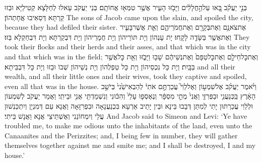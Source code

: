 {בְּנֵ֣י יַעֲקֹ֗ב בָּ֚אוּ עַל\maqqaf הַ֣חֲלָלִ֔ים וַיָּבֹ֖זּוּ הָעִ֑יר אֲשֶׁ֥ר טִמְּא֖וּ אֲחוֹתָֽם׃}
{בְּנֵי יַעֲקֹב עָאלוּ לְחַלָּצָא קְטִילַיָּא וּבַזוּ קַרְתָּא דְּסַאִיבוּ אֲחָתְהוֹן׃}
{The sons of Jacob came upon the slain, and spoiled the city, because they had defiled their sister.}{}
{אֶת\maqqaf צֹאנָ֥ם וְאֶת\maqqaf בְּקָרָ֖ם וְאֶת\maqqaf חֲמֹרֵיהֶ֑ם וְאֵ֧ת אֲשֶׁר\maqqaf בָּעִ֛יר וְאֶת\maqqaf אֲשֶׁ֥ר בַּשָּׂדֶ֖ה לָקָֽחוּ׃}
{יָת עָנְהוֹן וְיָת תּוֹרֵיהוֹן וְיָת חֲמָרֵיהוֹן וְיָת דִּבְקַרְתָּא וְיָת דִּבְחַקְלָא בַּזוּ׃}
{They took their flocks and their herds and their asses, and that which was in the city and that which was in the field;}{}
{וְאֶת\maqqaf כׇּל\maqqaf חֵילָ֤ם וְאֶת\maqqaf כׇּל\maqqaf טַפָּם֙ וְאֶת\maqqaf נְשֵׁיהֶ֔ם שָׁב֖וּ וַיָּבֹ֑זּוּ וְאֵ֖ת כׇּל\maqqaf אֲשֶׁ֥ר בַּבָּֽיִת׃}
{וְיָת כָּל נִכְסֵיהוֹן וְיָת כָּל טַפְלְהוֹן וְיָת נְשֵׁיהוֹן שְׁבוֹ וּבַזוּ וְיָת כָּל דִּבְבֵּיתָא׃}
{and all their wealth, and all their little ones and their wives, took they captive and spoiled, even all that was in the house.}{}
{וַיֹּ֨אמֶר יַעֲקֹ֜ב אֶל\maqqaf שִׁמְע֣וֹן וְאֶל\maqqaf לֵוִי֮ עֲכַרְתֶּ֣ם אֹתִי֒ לְהַבְאִישֵׁ֙נִי֙ בְּיֹשֵׁ֣ב הָאָ֔רֶץ בַּֽכְּנַעֲנִ֖י וּבַפְּרִזִּ֑י וַאֲנִי֙ מְתֵ֣י מִסְפָּ֔ר וְנֶאֶסְפ֤וּ עָלַי֙ וְהִכּ֔וּנִי וְנִשְׁמַדְתִּ֖י אֲנִ֥י וּבֵיתִֽי׃}
{וַאֲמַר יַעֲקֹב לְשִׁמְעוֹן וּלְלֵוִי עֲכַרְתּוּן יָתִי לְמִתַּן דְּבָבוּ בֵּינָא וּבֵין יָתֵיב אַרְעָא בִּכְנַעֲנָאָה וּבִפְרִזָּאָה וַאֲנָא עַם דְּמִנְיָן וְיִתְכַּנְשׁוּן עֲלַי וְיִמְחוֹנַנִי וְאֶשְׁתֵּיצֵי אֲנָא וַאֲנָשׁ בֵּיתִי׃}
{And Jacob said to Simeon and Levi: ‘Ye have troubled me, to make me odious unto the inhabitants of the land, even unto the Canaanites and the Perizzites; and, I being few in number, they will gather themselves together against me and smite me; and I shall be destroyed, I and my house.’}{}
